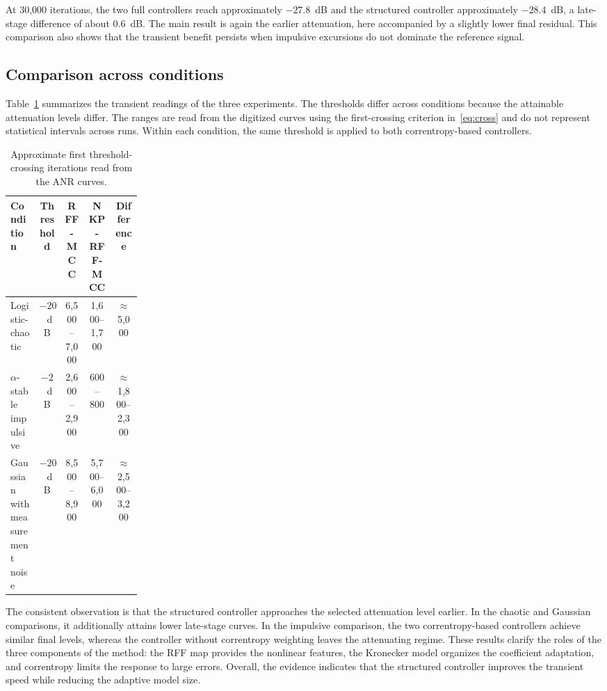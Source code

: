 \documentclass[preprint,12pt]{elsarticle}
\begin{document}
At 30,000 iterations, the two full controllers reach approximately $-27.8$~dB and the structured controller approximately $-28.4$~dB, a late-stage difference of about 0.6~dB. The main result is again the earlier attenuation, here accompanied by a slightly lower final residual. This comparison also shows that the transient benefit persists when impulsive excursions do not dominate the reference signal.

\subsection{Comparison across conditions}

Table~\ref{tab:cross} summarizes the transient readings of the three experiments. The thresholds differ across conditions because the attainable attenuation levels differ. The ranges are read from the digitized curves using the first-crossing criterion in~\eqref{eq:cross} and do not represent statistical intervals across runs. Within each condition, the same threshold is applied to both correntropy-based controllers.

\begin{table}[t]
\centering
\caption{Approximate first threshold-crossing iterations read from the ANR curves.}
\label{tab:cross}
\begin{tabular}{p{0.22\linewidth}cccc}
\toprule
Condition & Threshold & RFF-MCC & NKP-RFF-MCC & Difference \\
\midrule
Logistic-chaotic & $-20$~dB & 6,500--7,000 & 1,600--1,700 & $\approx$5,000 \\
$\alpha$-stable impulsive & $-2$~dB & 2,600--2,900 & 600--800 & $\approx$1,800--2,300 \\
Gaussian with measurement noise & $-20$~dB & 8,500--8,900 & 5,700--6,000 & $\approx$2,500--3,200 \\
\bottomrule
\end{tabular}
\end{table}

The consistent observation is that the structured controller approaches the selected attenuation level earlier. In the chaotic and Gaussian comparisons, it additionally attains lower late-stage curves. In the impulsive comparison, the two correntropy-based controllers achieve similar final levels, whereas the controller without correntropy weighting leaves the attenuating regime. These results clarify the roles of the three components of the method: the RFF map provides the nonlinear features, the Kronecker model organizes the coefficient adaptation, and correntropy limits the response to large errors. Overall, the evidence indicates that the structured controller improves the transient speed while reducing the adaptive model size.
\end{document}
